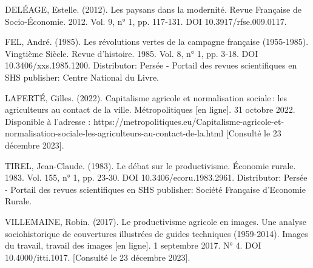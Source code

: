 \documentclass[12pt]{article}
\begin{document}
DELÉAGE, Estelle. (2012). Les paysans dans la modernité. Revue Française de Socio-Économie. 2012. Vol. 9, n° 1, pp. 117‑131. DOI 10.3917/rfse.009.0117.

FEL, André. (1985). Les révolutions vertes de la campagne française (1955-1985). Vingtième Siècle. Revue d’histoire. 1985. Vol. 8, n° 1, pp. 3‑18. DOI 10.3406/xxs.1985.1200. Distributor: Persée - Portail des revues scientifiques en SHS publisher: Centre National du Livre.

LAFERTÉ, Gilles. (2022). Capitalisme agricole et normalisation sociale : les agriculteurs au contact de la ville. Métropolitiques [en ligne]. 31 octobre 2022. Disponible à l’adresse : https://metropolitiques.eu/Capitalisme-agricole-et-normalisation-sociale-les-agriculteurs-au-contact-de-la.html [Consulté le 23 décembre 2023].

TIREL, Jean-Claude. (1983). Le débat sur le productivisme. Économie rurale. 1983. Vol. 155, n° 1, pp. 23‑30. DOI 10.3406/ecoru.1983.2961. Distributor: Persée - Portail des revues scientifiques en SHS publisher: Société Française d’Economie Rurale.

VILLEMAINE, Robin. (2017). Le productivisme agricole en images. Une analyse sociohistorique de couvertures illustrées de guides techniques (1959-2014). Images du travail, travail des images [en ligne]. 1 septembre 2017. N° 4. DOI 10.4000/itti.1017. [Consulté le 23 décembre 2023].
\end{document}
